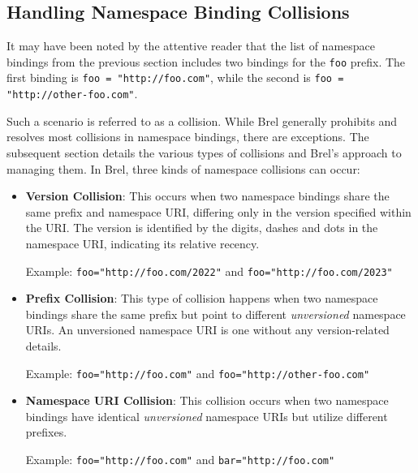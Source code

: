 

\subsection{Handling Namespace Binding Collisions}

It may have been noted by the attentive reader that the list of namespace bindings from the previous section includes two bindings for the \texttt{foo} prefix.
The first binding is \texttt{foo = "http://foo.com"}, while the second is \texttt{foo = "http://other-foo.com"}.

Such a scenario is referred to as a collision.
While Brel generally prohibits and resolves most collisions in namespace bindings, there are exceptions.
The subsequent section details the various types of collisions and Brel's approach to managing them.
In Brel, three kinds of namespace collisions can occur:

\begin{itemize}
\item \textbf{Version Collision}: This occurs when two namespace bindings share the same prefix and namespace URI, differing only in the version specified within the URI.
The version is identified by the digits, dashes and dots in the namespace URI, indicating its relative recency.

Example: \texttt{foo="http://foo.com/2022"} and \texttt{foo="http://foo.com/2023"}
\item \textbf{Prefix Collision}: This type of collision happens when two namespace bindings share the same prefix but point to different \textit{unversioned} namespace URIs.
An unversioned namespace URI is one without any version-related details.

Example: \texttt{foo="http://foo.com"} and \texttt{foo="http://other-foo.com"}
\item \textbf{Namespace URI Collision}: This collision occurs when two namespace bindings have identical \textit{unversioned} namespace URIs but utilize different prefixes.

Example: \texttt{foo="http://foo.com"} and \texttt{bar="http://foo.com"}
\end{itemize}


